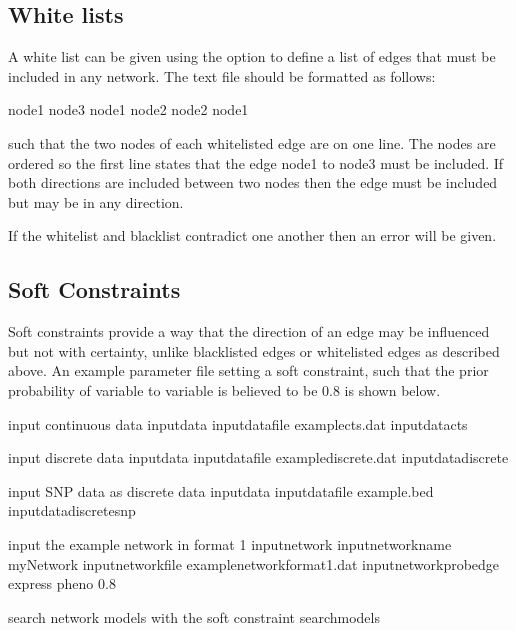 \documentclass[letterpaper,10pt,english]{sphinxmanual}
\begin{document}
\subsection{White lists}
\label{\detokenize{input-network:white-lists}}\label{\detokenize{input-network:input-network-white}}
\sphinxAtStartPar
A white list can be given using the  option to define a list of edges that must be included in any network. The text file should be formatted as follows:

\begin{sphinxVerbatim}[commandchars=\\\{\}]
node1 node3
node1 node2
node2 node1
\end{sphinxVerbatim}

\sphinxAtStartPar
such that the two nodes of each whitelisted edge are on one line. The nodes are ordered so the first line states that the edge node1 to node3 must be included.
If both directions are included between two nodes then the edge must be included but may be in any direction.

\sphinxAtStartPar
If the whitelist and blacklist contradict one another then an error will be given.


\subsection{Soft Constraints}
\label{\detokenize{input-network:soft-constraints}}\label{\detokenize{input-network:input-network-soft-con}}
\sphinxAtStartPar
Soft constraints provide a way that the direction of an edge may be influenced but not with certainty, unlike blacklisted edges or whitelisted edges as described above.
An example parameter file setting a soft constraint, such that the prior probability of variable  to variable  is believed to be 0.8 is shown below.

\begin{sphinxVerbatim}[commandchars=\\\{\}]
\PYGZsh{}input continuous data
\PYGZhy{}input\PYGZhy{}data
\PYGZhy{}input\PYGZhy{}data\PYGZhy{}file example\PYGZhy{}cts.dat
\PYGZhy{}input\PYGZhy{}data\PYGZhy{}cts

\PYGZsh{}input discrete data
\PYGZhy{}input\PYGZhy{}data
\PYGZhy{}input\PYGZhy{}data\PYGZhy{}file example\PYGZhy{}discrete.dat
\PYGZhy{}input\PYGZhy{}data\PYGZhy{}discrete

\PYGZsh{}input SNP data as discrete data
\PYGZhy{}input\PYGZhy{}data
\PYGZhy{}input\PYGZhy{}data\PYGZhy{}file example.bed
\PYGZhy{}input\PYGZhy{}data\PYGZhy{}discrete\PYGZhy{}snp

\PYGZsh{}input the example network in format 1
\PYGZhy{}input\PYGZhy{}network
\PYGZhy{}input\PYGZhy{}network\PYGZhy{}name myNetwork
\PYGZhy{}input\PYGZhy{}network\PYGZhy{}file example\PYGZhy{}network\PYGZhy{}format1.dat
\PYGZhy{}input\PYGZhy{}network\PYGZhy{}prob\PYGZhy{}edge express pheno 0.8

\PYGZsh{}search network models with the soft constraint
\PYGZhy{}search\PYGZhy{}models
\end{sphinxVerbatim}
\end{document}
